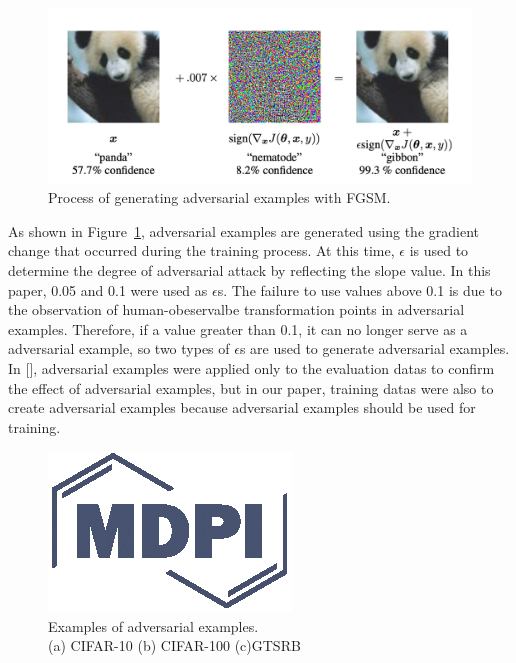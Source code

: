 \documentclass[journal,article,submit,moreauthors,pdftex]{Definitions/mdpi}
\begin{document}
\begin{figure}[H] 
\includegraphics[width=13cm]{Definitions/fgsm.png}
\caption{Process of generating adversarial examples with FGSM.\label{fgsm}}
\end{figure} 

As shown in Figure~\ref{fgsm}, adversarial examples are generated using the gradient change that occurred during the training process.
At this time, \begin{math}\epsilon\end{math} is used to determine the degree of adversarial attack by reflecting the slope value.
In this paper, 0.05 and 0.1 were used as \begin{math}\epsilon\end{math}s. The failure to use values above 0.1 is due to the observation of human-obeservalbe transformation points in adversarial examples.
Therefore, if a value greater than 0.1, it can no longer serve as a adversarial example, so two types of \begin{math}\epsilon\end{math}s are used to generate adversarial examples.
In [], adversarial examples were applied only to the evaluation datas to confirm the effect of adversarial examples, but in our paper, training datas were also to create adversarial examples because adversarial examples should be used for training.

\begin{figure}[H]
\includegraphics[width=5 cm]{Definitions/logo-mdpi}
\caption{Examples of adversarial examples.\\(a) CIFAR-10 (b) CIFAR-100 (c)GTSRB\label{fig5}}
\end{figure} 
\end{document}
